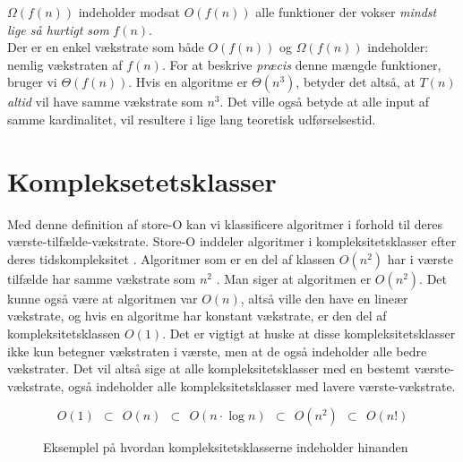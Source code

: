 $\Omega (f(n))$ indeholder modsat $O(f(n))$ alle funktioner der vokser \emph{mindst lige så hurtigt som} $f(n)$.\\

Der er en enkel vækstrate som både $O(f(n))$ og $\Omega (f(n))$ indeholder: nemlig vækstraten af $f(n)$. For at beskrive \emph{præcis} denne mængde funktioner, bruger vi $\Theta (f(n))$. Hvis en algoritme er $\Theta (n^3)$, betyder det altså, at $T(n)$ \emph{altid} vil have samme vækstrate som $n^3$. Det ville også betyde at alle input af samme kardinalitet, vil resultere i lige lang teoretisk udførselsestid.


\section{Kompleksetetsklasser} 
\label{sec:Kompleksetetsklasser}


Med denne definition af store-O kan vi klassificere algoritmer i forhold til deres værste-tilfælde-vækstrate. Store-O inddeler algoritmer i kompleksitetsklasser efter deres tidskompleksitet \cite{time-complexity}. Algoritmer som er en del af klassen $O(n^2)$ har i værste tilfælde har samme vækstrate som $n^2$ . Man siger at algoritmen er $O(n^2)$. Det kunne også være at algoritmen var $O(n)$, altså ville den have en lineær vækstrate, og hvis en algoritme har konstant vækstrate, er den del af kompleksitetsklassen $O(1)$. Det er vigtigt at huske at disse kompleksitetsklasser ikke kun betegner vækstraten i værste, men at de også indeholder alle bedre vækstrater. Det vil altså sige at alle kompleksitetsklasser med en bestemt værste-vækstrate, også indeholder alle kompleksitetsklasser med lavere værste-vækstrate. 

\begin{figure}[h]
	\begin{center}
		$$O(1) \:\:\subset\:\: O(n) \:\:\subset\:\: O(n \cdot \log n) \:\:\subset\:\: O(n^2) \:\:\subset\:\: O(n!)$$
	\end{center}
	\caption{Eksemplel på hvordan kompleksitetsklasserne indeholder hinanden}
	\label{fig:kompleksitetsklasserne-indeholder-hinanden}
\end{figure}




